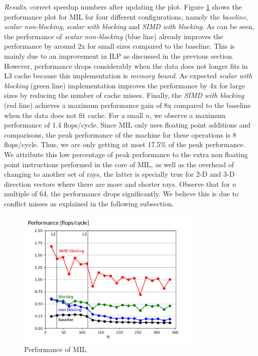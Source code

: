 \documentclass[letterpaper]{article}
\begin{document}
\textit{Results}. 
{\color{red} correct speedup numbers after updating the plot.}
Figure \ref{res:mil} shows the performance plot for MIL for four different configurations, namely the \textit{baseline},\textit{ scalar non-blocking}, \textit{scalar with blocking} and \textit{SIMD with blocking}. As can be seen, the performance of \textit{scalar non-blocking} (blue line) already improves the performance by around {\color{red} 2x} for small sizes compared to the baseline. This is mainly due to an improvement in ILP as discussed in the previous section. However, performance drops considerably when the data does not longer fits in L3 cache because this implementation is \textit{memory bound}. As expected \textit{scalar with blocking} (green line) implementation improves the performance by {\color{red} 4x} for large sizes by reducing the number of cache misses. Finally, the \textit{SIMD with blocking} (red line) achieves a maximum performance gain of {\color{red} 8x} compared to the baseline when the data does not fit cache. For a small $n$, we observe a maximum performance of {\color{red} 1.4} flops/cycle. Since MIL only uses floating point additions and comparisons, the peak performance of the machine for these operations is 8 flops/cycle. Thus, we are only getting at most {\color{red} 17.5\%} of the peak performance. We attribute this low percentage of peak performance to the extra non floating point instructions performed in the core of MIL, as well as the overhead of changing to another set of rays, the latter is specially true for 2-D and 3-D direction vectors where there are more and shorter rays. Observe that for $n$ multiple of 64, the performance drops significantly. We believe this is due to conflict misses as explained in the following subsection.

\begin{figure}[H]
  \centering
  \includegraphics[width=3.5in]{figs/plots/mil/mil_performance.pdf}
  \caption{Performance of MIL}
  \label{res:mil}
\end{figure}
\end{document}
